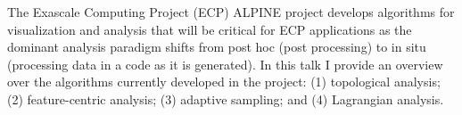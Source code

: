 \license


The Exascale Computing Project (ECP) ALPINE project develops algorithms for visualization and analysis that will be critical for ECP applications as the dominant analysis paradigm shifts from post hoc (post processing) to in situ (processing data in a code as it is generated). In this talk I provide an overview over the algorithms currently developed in the project: (1) topological analysis; (2) feature-centric analysis; (3) adaptive sampling; and (4) Lagrangian analysis.

